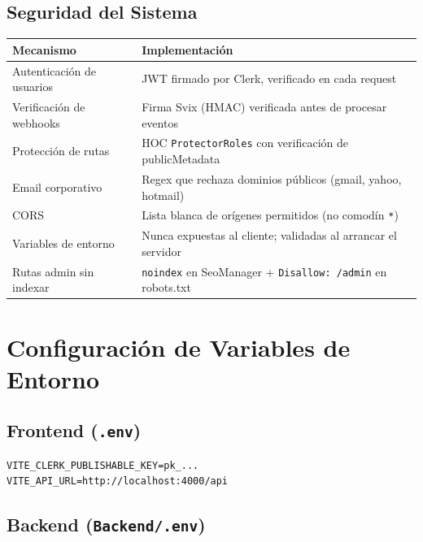 \documentclass[12pt, a4paper, twoside]{report}
\begin{document}
\subsection{Seguridad del Sistema}

\begin{center}
\begin{tabular}{L{4.5cm} L{9cm}}
  \toprule
  \textbf{Mecanismo} & \textbf{Implementación} \\
  \midrule
  Autenticación de usuarios  & JWT firmado por Clerk, verificado en cada request \\
  Verificación de webhooks   & Firma Svix (HMAC) verificada antes de procesar eventos \\
  Protección de rutas        & HOC \texttt{ProtectorRoles} con verificación de publicMetadata \\
  Email corporativo          & Regex que rechaza dominios públicos (gmail, yahoo, hotmail) \\
  CORS                       & Lista blanca de orígenes permitidos (no comodín \texttt{*}) \\
  Variables de entorno       & Nunca expuestas al cliente; validadas al arrancar el servidor \\
  Rutas admin sin indexar    & \texttt{noindex} en SeoManager + \texttt{Disallow: /admin} en robots.txt \\
  \bottomrule
\end{tabular}
\end{center}

\section{Configuración de Variables de Entorno}

\subsection*{Frontend (\texttt{.env})}

\begin{tcolorbox}[codebox]
\begin{lstlisting}[style=env, numbers=none]
VITE_CLERK_PUBLISHABLE_KEY=pk_...
VITE_API_URL=http://localhost:4000/api
\end{lstlisting}
\end{tcolorbox}

\subsection*{Backend (\texttt{Backend/.env})}
\end{document}
